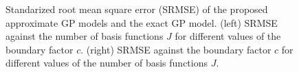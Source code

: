 \documentclass[]{interact}
\theoremstyle{plain}%
\theoremstyle{definition}
\theoremstyle{remark}
\begin{document}
\begin{figure}[H]
\centering
{}
\caption{Standarized root mean square error (SRMSE) of the proposed approximate GP models and the exact GP model. (left) SRMSE against the number of basis functions $J$ for different values of the boundary factor $c$. (right) SRMSE against the boundary factor $c$ for different values of the number of basis functions $J$. }
  \label{fig5_MSE_vs_J}
\end{figure}
\end{document}
